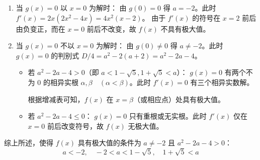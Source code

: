\begin{questions}
\begin{parts}
\begin{solution}
        \begin{enumerate}[label=(\roman*)]
            \item 当 $g(x)=0$ 以 $x=0$ 为解时：
            由 $g(0)=0$ 得 $a=-2$。此时 $f'(x) = 2x(2x^2-4x) = 4x^2(x-2)$。
            由于 $f'(x)$ 的符号在 $x=2$ 前后由负变正，而在 $x=0$ 前后不改变，故 $f(x)$ 不具有极大值。
            
            \item 当 $g(x)=0$ 不以 $x=0$ 为解时：
            由 $g(0) \neq 0$ 得 $a \neq -2$。此时 $g(x)=0$ 的判别式 $D/4 = a^2 - 2(a+2) = a^2 - 2a - 4$。
            
            \begin{itemize}
                \item 若 $a^2 - 2a - 4 > 0$（即 $a < 1-\sqrt{5}, 1+\sqrt{5} < a$）：
                $g(x)=0$ 有两个不为 $0$ 的相异实根 $\alpha, \beta \quad (\alpha < \beta)$。此时 $f'(x)=0$ 有三个相异实数解。
                
                
                
                根据增减表可知，$f(x)$ 在 $x=\beta$（或相应点）处具有极大值。
                
                \item 若 $a^2 - 2a - 4 \le 0$：
                $g(x)=0$ 只有重根或无实根。此时 $f'(x)$ 仅在 $x=0$ 前后改变符号，故 $f(x)$ 无极大值。
            \end{itemize}
        \end{enumerate}
        综上所述，使得 $f(x)$ 具有极大值的条件为 $a \neq -2$ 且 $a^2 - 2a - 4 > 0$：
        \[ a < -2, \quad -2 < a < 1-\sqrt{5}, \quad 1+\sqrt{5} < a  \]
    \end{solution}


\end{parts}
\end{questions}
